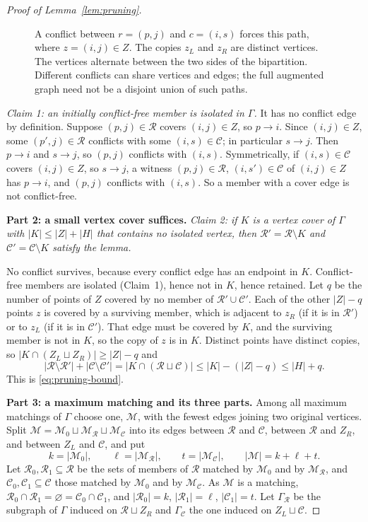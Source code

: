 \documentclass[11pt]{article}
\theoremstyle{remark}
\newcommand{\abs}[1]{\lvert #1\rvert}
\newcommand{\Step}[1]{\par\medskip\noindent\textbf{#1}\enspace}
\newcommand{\cR}{\mathcal R}
\newcommand{\cC}{\mathcal C}
\newcommand{\cM}{\mathcal M}
\begin{document}
\begin{proof}[Proof of Lemma~\ref{lem:pruning}]
\begin{figure}[!ht]
 \caption{A conflict between $r=(p,j)$ and $c=(i,s)$ forces this path,
 where $z=(i,j)\in Z$. The copies $z_L$ and $z_R$ are distinct vertices.
 The vertices alternate between the two sides of the bipartition.
 Different conflicts can share vertices and edges; the full augmented
 graph need not be a disjoint union of such paths.}
 \label{fig:pruning}
\end{figure}

\emph{Claim 1: an initially conflict-free member is isolated in $\Gamma$.}
It has no conflict edge by definition. Suppose $(p,j)\in\cR$ covers
$(i,j)\in Z$, so $p\to i$. Since $(i,j)\in Z$, some
$(p',j)\in\cR$ conflicts with some $(i,s)\in\cC$; in particular $s\to j$.
Then $p\to i$ and $s\to j$, so $(p,j)$ conflicts with $(i,s)$. Symmetrically,
if $(i,s)\in\cC$ covers $(i,j)\in Z$, so $s\to j$, a witness
$(p,j)\in\cR$, $(i,s')\in\cC$ of $(i,j)\in Z$ has $p\to i$, and $(p,j)$
conflicts with $(i,s)$. So a member with a cover edge is not conflict-free.

\Step{Part 2: a small vertex cover suffices.}
\emph{Claim 2: if $K$ is a vertex cover of $\Gamma$ with
$\abs K\le\abs Z+\abs H$ that contains no isolated vertex, then
$\cR'=\cR\setminus K$ and $\cC'=\cC\setminus K$ satisfy the lemma.}

No conflict survives, because every conflict edge has an endpoint in $K$.
Conflict-free members are isolated (Claim~1), hence not in $K$, hence
retained. Let $q$ be the number of points of $Z$ covered by no member of
$\cR'\cup\cC'$. Each of the other $\abs Z-q$ points $z$ is covered by a
surviving member, which is adjacent to $z_R$ (if it is in $\cR'$) or to
$z_L$ (if it is in $\cC'$). That edge must be covered by $K$, and the
surviving member is not in $K$, so the copy of $z$ is in $K$. Distinct
points have distinct copies, so
$\abs{K\cap(Z_L\sqcup Z_R)}\ge\abs Z-q$ and
\begin{equation}\label{eq:cover-charge}
 \abs{\cR\setminus\cR'}+\abs{\cC\setminus\cC'}
 =\abs{K\cap(\mathcal R\sqcup\mathcal C)}
 \leq \abs K-(\abs Z-q)\leq\abs H+q .
\end{equation}
This is \eqref{eq:pruning-bound}.

\Step{Part 3: a maximum matching and its three parts.}
Among all maximum matchings of $\Gamma$ choose one, $\cM$, with the fewest
edges joining two original vertices. Split
$\cM=\cM_0\sqcup\cM_{\cR}\sqcup\cM_{\cC}$ into its edges between $\cR$ and
$\cC$, between $\cR$ and $Z_R$, and between $Z_L$ and $\cC$, and put
\[
 k=\abs{\cM_0},\qquad\ell=\abs{\cM_{\cR}},\qquad t=\abs{\cM_{\cC}},
 \qquad\abs{\mathcal M}=k+\ell+t.
\]
Let $\cR_0,\cR_1\subseteq\cR$ be the sets of members of $\cR$ matched by
$\cM_0$ and by $\cM_{\cR}$, and $\cC_0,\cC_1\subseteq\cC$ those matched by
$\cM_0$ and by $\cM_{\cC}$. As $\cM$ is a matching,
$\cR_0\cap\cR_1=\varnothing=\cC_0\cap\cC_1$, and
$\abs{\cR_0}=k$, $\abs{\cR_1}=\ell$, $\abs{\cC_1}=t$.
Let $\Gamma_{\cR}$ be the subgraph of $\Gamma$ induced on $\cR\sqcup Z_R$
and $\Gamma_{\cC}$ the one induced on $Z_L\sqcup\cC$.


\end{proof}
\end{document}
